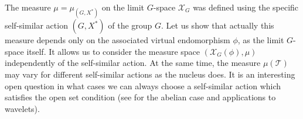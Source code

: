 \documentclass[12pt]{article}
\newcommand{\limGs}[1][G]{\mathcal{X}_{#1}}
\newcommand{\tile}{\mathscr{T}}
\newcommand{\nucl}{\mathcal{N}}
\theoremstyle{definition}
\begin{document}


The measure $\mu=\mu_{(G,X^{*})}$ on the limit $G$-space $\limGs$ was defined using the specific
self-similar action $(G,X^{*})$ of the group $G$. Let us show that actually this measure depends
only on the associated virtual endomorphism $\phi$, as the limit $G$-space itself. It allows us to
consider the measure space $(\limGs(\phi),\mu)$ independently of the self-similar action. At the
same time, the measure $\mu(\tile)$ may vary for different self-similar actions as the nucleus
does. It is an interesting open question in what cases we can always choose a self-similar action
which satisfies the open set condition (see \cite{mult_an_self_sim,lag_wang:haar} for the abelian
case and applications to wavelets).
\end{document}
